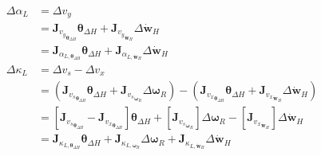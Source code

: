 \begin{equation}
    \begin{split}
        \Delta \alpha_L &= \Delta v_y\\
        &= \mathbf{J}_{{v_y}_{\boldsymbol{\theta}_{\Delta H}}} \boldsymbol{\theta}_{\Delta H} + \mathbf{J}_{{v_y}_{\dot{\mathbf{w}}_H}} \Delta {\dot{\mathbf{w}}}_H\\
        &= \mathbf{J}_{\alpha_{L, \boldsymbol{\theta}_{\Delta H}}}\boldsymbol{\theta}_{\Delta H} + \mathbf{J}_{\alpha_{L, \dot{\mathbf{w}}_H}}\Delta {\dot{\mathbf{w}}}_H\\
        \Delta \kappa_L &= \Delta v_s - \Delta v_x\\
        &= \left(\mathbf{J}_{{v_s}_{\boldsymbol{\theta}_{\Delta H}}} \boldsymbol{\theta}_{\Delta H} + \mathbf{J}_{{v_s}_{\boldsymbol{\omega}_R}} \Delta \boldsymbol{\omega}_R\right) - \left(\mathbf{J}_{{v_x}_{\boldsymbol{\theta}_{\Delta H}}} \boldsymbol{\theta}_{\Delta H} + \mathbf{J}_{{v_x}_{\dot{\mathbf{w}}_H}} \Delta {\dot{\mathbf{w}}}_H\right)\\
        &= \left[\mathbf{J}_{{v_s}_{\boldsymbol{\theta}_{\Delta H}}} - \mathbf{J}_{{v_x}_{\boldsymbol{\theta}_{\Delta H}}} \right] \boldsymbol{\theta}_{\Delta H} + \left[\mathbf{J}_{{v_s}_{\boldsymbol{\omega}_R}}\right] \Delta \boldsymbol{\omega}_R - \left[\mathbf{J}_{{v_x}_{\dot{\mathbf{w}}_H}}\right] \Delta {\dot{\mathbf{w}}}_H\\
        &= \mathbf{J}_{\kappa_{L, \boldsymbol{\theta}_{\Delta H}}}\boldsymbol{\theta}_{\Delta H} + \mathbf{J}_{\kappa_{L, \boldsymbol{\omega}_R}}\Delta \boldsymbol{\omega}_R + \mathbf{J}_{\kappa_{L, \dot{\mathbf{w}}_H}}\Delta {\dot{\mathbf{w}}}_H
    \end{split}
\end{equation}
